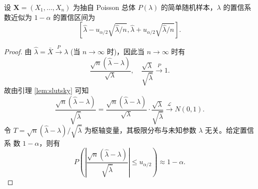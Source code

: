 \begin{proposition}\label{prop:Poisson 分布参数的置信区间}
    设 $\mathbf{X} = (X_1, \dots, X_n)$ 为抽自 Poisson 总体 $P(\lambda)$ 的简单随机样本，$\lambda$ 的置信系数近似为 $1-\alpha$ 的置信区间为
\begin{equation}
\left[\hat{\lambda} - u_{\alpha/2}\sqrt{\hat{\lambda}/n}, \hat{\lambda} + u_{\alpha/2}\sqrt{\hat{\lambda}/n}\right]. \label{eq:poisson_lambda_ci}
\end{equation}
\end{proposition}
\begin{proof}
    由 $\hat{\lambda} = \bar{X} \stackrel{P}{\longrightarrow} \lambda$ (当 $n \to \infty$ 时)，因此当
$n \to \infty$ 时有
$$\frac{\sqrt{n}(\hat{\lambda}-\lambda)}{\sqrt{\lambda}}, \quad \frac{\sqrt{\lambda}}{\sqrt{\hat{\lambda}}} \stackrel{P}{\longrightarrow} 1.$$
故由引理 \ref{lem:slutsky} 可知
\begin{equation}
\frac{\sqrt{n}(\hat{\lambda}-\lambda)}{\sqrt{\hat{\lambda}}} = \frac{\sqrt{n}(\hat{\lambda}-\lambda)}{\sqrt{\lambda}} \cdot \frac{\sqrt{\lambda}}{\sqrt{\hat{\lambda}}} \stackrel{\mathscr{L}}{\longrightarrow} N(0,1). \label{eq:poisson_pivotal_quantity}
\end{equation}
令 $T = \sqrt{n}(\hat{\lambda}-\lambda)/\sqrt{\hat{\lambda}}$ 为枢轴变量，其极限分布与未知参数 $\lambda$ 无关。给定置信系
数 $1-\alpha$，则有
$$P\left(\left|\frac{\sqrt{n}(\hat{\lambda}-\lambda)}{\sqrt{\hat{\lambda}}}\right| \le u_{\alpha/2}\right) \approx 1-\alpha.$$
\end{proof}







